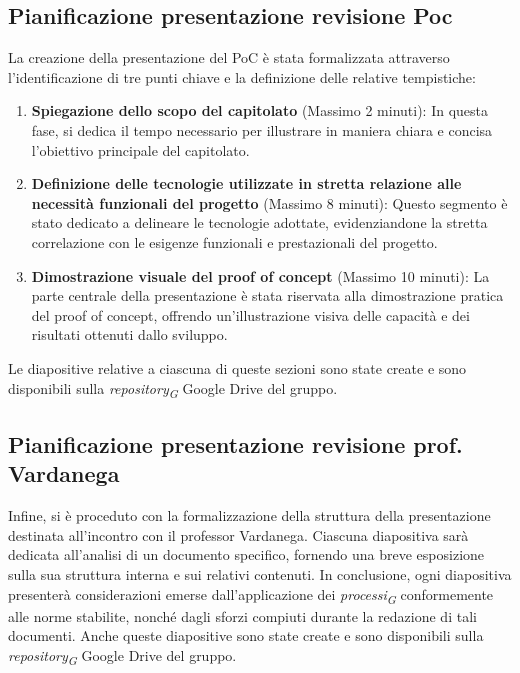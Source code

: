 \documentclass{article}
\begin{document}
\subsection{Pianificazione presentazione revisione Poc}
La creazione della presentazione del PoC è stata formalizzata attraverso l'identificazione di tre punti chiave e la definizione delle relative tempistiche:

\begin{enumerate}
    \item \textbf{Spiegazione dello scopo del capitolato} (Massimo 2 minuti): In questa fase, si dedica il tempo necessario per illustrare in maniera chiara e concisa l'obiettivo principale del capitolato.
    
    \item \textbf{Definizione delle tecnologie utilizzate in stretta relazione alle necessità funzionali del progetto} (Massimo 8 minuti): Questo segmento è stato dedicato a delineare le tecnologie adottate, evidenziandone la stretta correlazione con le esigenze funzionali e prestazionali del progetto.
    
    \item \textbf{Dimostrazione visuale del proof of concept} (Massimo 10 minuti): La parte centrale della presentazione è stata riservata alla dimostrazione pratica del proof of concept, offrendo un'illustrazione visiva delle capacità e dei risultati ottenuti dallo sviluppo.
\end{enumerate}

Le diapositive relative a ciascuna di queste sezioni sono state create e sono disponibili sulla \textit{repository}\textsubscript{\textit{G}} Google Drive del gruppo.

\subsection{Pianificazione presentazione revisione prof. Vardanega}
Infine, si è proceduto con la formalizzazione della struttura della presentazione destinata all'incontro con il professor Vardanega. Ciascuna diapositiva sarà dedicata all'analisi di un documento specifico, fornendo una breve esposizione sulla sua struttura interna e sui relativi contenuti. In conclusione, ogni diapositiva presenterà considerazioni emerse dall'applicazione dei \textit{processi}\textsubscript{\textit{G}} conformemente alle norme stabilite, nonché dagli sforzi compiuti durante la redazione di tali documenti.
Anche queste diapositive sono state create e sono disponibili sulla \textit{repository}\textsubscript{\textit{G}} Google Drive del gruppo.
\end{document}
